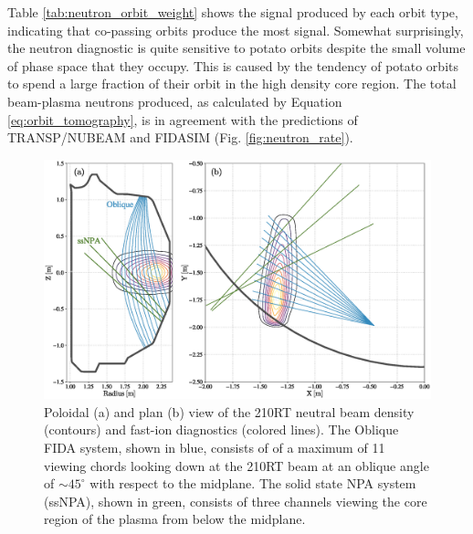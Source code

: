 Table \ref{tab:neutron_orbit_weight} shows the signal produced by each orbit type, indicating that co-passing orbits produce the most signal. Somewhat surprisingly, the neutron diagnostic is quite sensitive to potato orbits despite the small volume of phase space that they occupy. This is caused by the tendency of potato orbits to spend a large fraction of their orbit in the high density core region. 
The total beam-plasma neutrons produced, as calculated by Equation \ref{eq:orbit_tomography}, is in agreement with the predictions of TRANSP/NUBEAM and FIDASIM (Fig. \ref{fig:neutron_rate}).
\begin{figure}[h!]
    \centering
    \includegraphics[width=15cm]{figures/geometry.eps}
    \caption{Poloidal (a) and plan (b) view of the 210RT neutral beam density (contours) and fast-ion diagnostics (colored lines). The Oblique FIDA system\cite{muscatello2010}, shown in blue, consists of of a maximum of 11 viewing chords looking down at the 210RT beam at an oblique angle of 
$\sim45^{\circ}$ with respect to the midplane. The solid state NPA system (ssNPA)\cite{ssNPA2012}, shown in green, consists of three channels viewing the core region of the plasma from below the midplane.}
    \label{fig:geometry}
\end{figure}

